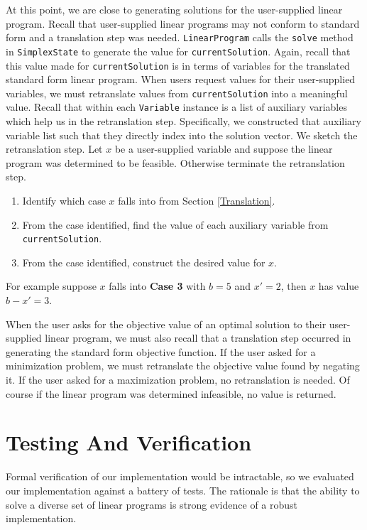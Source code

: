 \documentclass{article}
\newcommand{\javaCode}[1]{\texttt{#1}}
\begin{document}
At this point, we are close to generating solutions for the user-supplied linear program. Recall that user-supplied linear programs may not conform to standard form and a translation step was needed. \javaCode{LinearProgram} calls the \javaCode{solve} method in \javaCode{SimplexState} to generate the value for \javaCode{currentSolution}. Again, recall that this value made for \javaCode{currentSolution} is in terms of variables for the translated standard form linear program. When users request values for their user-supplied variables, we must retranslate values from \javaCode{currentSolution} into a meaningful value. Recall that within each \javaCode{Variable} instance is a list of auxiliary variables which help us in the retranslation step. Specifically, we constructed that auxiliary variable list such that they directly index into the solution vector. We sketch the retranslation step. Let $x$ be a user-supplied variable and suppose the linear program was determined to be feasible. Otherwise terminate the retranslation step.
\begin{enumerate}
    \item Identify which case $x$ falls into from Section \ref{Translation}.
    \item From the case identified, find the value of each auxiliary variable from \javaCode{currentSolution}.
    \item From the case identified, construct the desired value for $x$.
\end{enumerate}
For example suppose $x$ falls into \textbf{Case 3} with $b = 5$ and $x' = 2$, then $x$ has value $b - x' = 3$.

When the user asks for the objective value of an optimal solution to their user-supplied linear program, we must also recall that a translation step occurred in generating the standard form objective function. If the user asked for a minimization problem, we must retranslate the objective value found by negating it. If the user asked for a maximization problem, no retranslation is needed. Of course if the linear program was determined infeasible, no value is returned.

\section{Testing And Verification} \label{Testing}
Formal verification of our implementation would be intractable, so we evaluated our implementation against a battery of tests. The rationale is that the ability to solve a diverse set of linear programs is strong evidence of a robust implementation.
\end{document}
